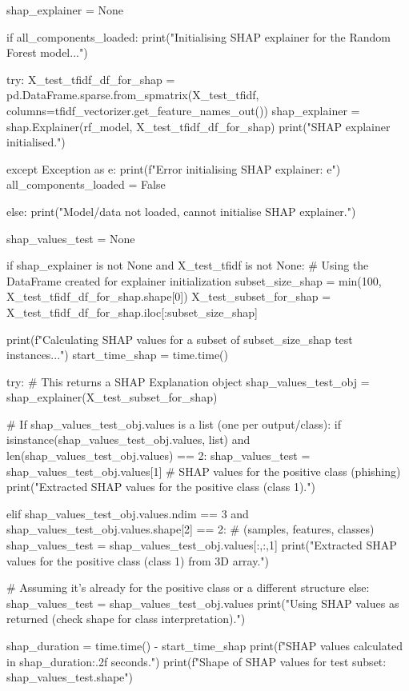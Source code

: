 \begin{ffcode}
shap_explainer = None

if all_components_loaded:
    print("Initialising SHAP explainer for the Random Forest model...")

    try:
        X_test_tfidf_df_for_shap = pd.DataFrame.sparse.from_spmatrix(X_test_tfidf, columns=tfidf_vectorizer.get_feature_names_out())
        shap_explainer = shap.Explainer(rf_model, X_test_tfidf_df_for_shap)
        print("SHAP explainer initialised.")

    except Exception as e:
        print(f"Error initialising SHAP explainer: {e}")
        all_components_loaded = False

else:
    print("Model/data not loaded, cannot initialise SHAP explainer.")

shap_values_test = None

if shap_explainer is not None and X_test_tfidf is not None:
    # Using the DataFrame created for explainer initialization
    subset_size_shap = min(100, X_test_tfidf_df_for_shap.shape[0])
    X_test_subset_for_shap = X_test_tfidf_df_for_shap.iloc[:subset_size_shap]

    print(f"Calculating SHAP values for a subset of {subset_size_shap} test instances...")
    start_time_shap = time.time()

    try:
        # This returns a SHAP Explanation object
        shap_values_test_obj = shap_explainer(X_test_subset_for_shap)

        # If shap_values_test_obj.values is a list (one per output/class):
        if isinstance(shap_values_test_obj.values, list) and len(shap_values_test_obj.values) == 2:
            shap_values_test = shap_values_test_obj.values[1] # SHAP values for the positive class (phishing)
            print("Extracted SHAP values for the positive class (class 1).")

        elif shap_values_test_obj.values.ndim == 3 and shap_values_test_obj.values.shape[2] == 2: # (samples, features, classes)
            shap_values_test = shap_values_test_obj.values[:,:,1]
            print("Extracted SHAP values for the positive class (class 1) from 3D array.")

        # Assuming it's already for the positive class or a different structure
        else:
            shap_values_test = shap_values_test_obj.values
            print("Using SHAP values as returned (check shape for class interpretation).")

        shap_duration = time.time() - start_time_shap
        print(f"SHAP values calculated in {shap_duration:.2f} seconds.")
        print(f"Shape of SHAP values for test subset: {shap_values_test.shape}")


\end{ffcode}
